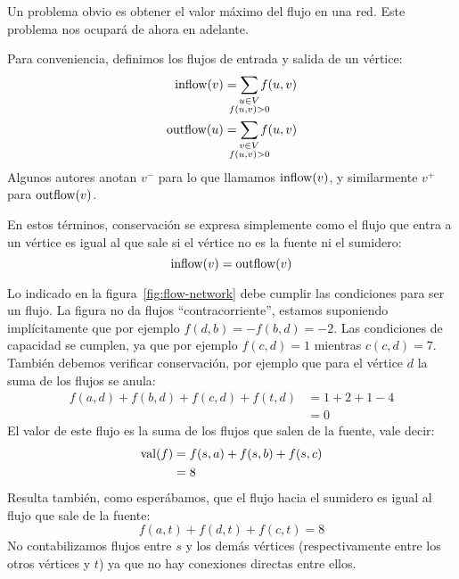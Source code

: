   Un problema obvio
  es obtener el valor máximo del flujo en una red.%
  Este problema nos ocupará de ahora en adelante.

  Para conveniencia,
  definimos los flujos de entrada y salida de un vértice:
  \begin{align*}
    \inflow(v)
      &= \sum_{\mathclap{\substack{
			   u \in V	\\
			   f(u, v) > 0
	      }}} f(u, v) \\
    \outflow(u)
      &= \sum_{\mathclap{\substack{
			   v \in V	 \\
			   f(u, v) > 0
	      }}} f(u, v)
  \end{align*}
  Algunos autores anotan \(v^{-}\)
  para lo que llamamos \(\operatorname{inflow}(v)\),
  y similarmente \(v^{+}\) para \(\operatorname{outflow}(v)\).

  En estos términos,
  conservación se expresa simplemente
  como el flujo que entra a un vértice es igual al que sale
  si el vértice no es la fuente ni el sumidero:
  \begin{equation*}
    \operatorname{inflow}(v) = \operatorname{outflow}(v)
  \end{equation*}


  Lo indicado en la figura~\ref{fig:flow-network}
  debe cumplir las condiciones para ser un flujo.
  La figura no da flujos ``contracorriente'',
  estamos suponiendo implícitamente
  que por ejemplo \(f(d, b) = - f(b, d) = -2\).
  Las condiciones de capacidad se cumplen,
  ya que por ejemplo \(f(c, d) = 1\) mientras \(c(c, d) = 7\).
  También debemos verificar conservación,
  por ejemplo que para el vértice \(d\)
  la suma de los flujos se anula:
  \begin{align*}
    f(a, d) + f(b, d) + f(c, d) + f(t, d)
      &= 1 + 2 + 1 - 4 \\
      &= 0
  \end{align*}
  El valor de este flujo
  es la suma de los flujos que salen de la fuente,
  vale decir:
  \begin{align*}
    \operatorname{val}(f)
      &= f(s, a) + f(s, b) + f(s, c) \\
      &= 8
  \end{align*}
  Resulta también,
  como esperábamos,
  que el flujo hacia el sumidero
  es igual al flujo que sale de la fuente:
  \begin{equation*}
    f(a, t) + f(d, t) + f(c, t)
      = 8
  \end{equation*}
  No contabilizamos flujos entre \(s\) y los demás vértices
  (respectivamente entre los otros vértices y \(t\))
  ya que no hay conexiones directas entre ellos.

